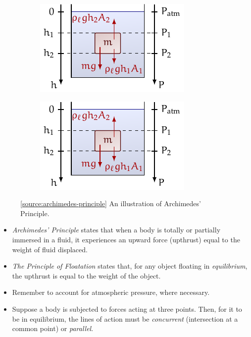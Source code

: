 \documentclass[oneside]{book}
\begin{document}
\begin{minipage}{0.5\textwidth}
    \begin{figure}[H]
        \centering
        \begin{subfigure}[c]{0.5\textwidth}
            \centering
            \includegraphics[page=3]{../images/Upthrust/Upthrust.pdf}
        \end{subfigure}%
        \begin{subfigure}[c]{0.5\textwidth}
            \centering
            \vspace{1cm}
            \includegraphics[page=4]{../images/Upthrust/Upthrust.pdf}
        \end{subfigure}%
        \caption{\ref{source:archimedes-principle} An illustration of Archimedes' Principle.}
        \label{fig:archimedes-principle}
    \end{figure}
\end{minipage}%
\begin{minipage}{0.5\textwidth}
    \begin{itemize}
        \item \emph{Archimedes' Principle} states that when a body is totally or partially immersed in a fluid, it experiences an upward force (upthrust) equal to the weight of fluid displaced.
        \item \emph{The Principle of Floatation} states that, for any object floating in \emph{equilibrium}, the upthrust is equal to the weight of the object.
    \end{itemize}
\end{minipage}
\begin{itemize}
    \item Remember to account for atmospheric pressure, where necessary.
    \item Suppose a body is subjected to forces acting at three points. Then, for it to be in equilibrium, the lines of action must be \emph{concurrent} (intersection at a common point) or \emph{parallel}. 
\end{itemize}
\end{document}
